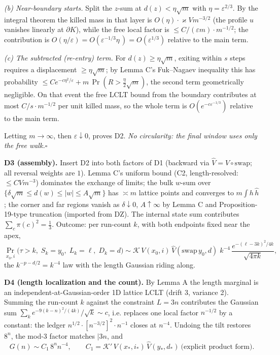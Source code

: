 \documentclass[11pt]{article}
\begin{document}
\emph{(b) Near-boundary starts.} Split the $z$-sum at $d(z)<\eta\sqrt m$ with
$\eta=\varepsilon^{2/3}$. By the integral theorem the killed mass in that layer is
$O(\eta)\cdot\varkappa V m^{-3/2}$ (the profile $u$ vanishes linearly at $\partial K$),
while the free local factor is $\le C/(\varepsilon m)\cdot m^{-1/2}$; the contribution is
$O(\eta/\varepsilon)=O(\varepsilon^{-1/3}\eta^{\,}\!)=O(\varepsilon^{1/3})$ relative to the
main term.

\emph{(c) The subtracted (re-entry) term.} For $d(z)\ge\eta\sqrt m$, exiting within $s$
steps requires a displacement $\ge\eta\sqrt m$; by Lemma C's Fuk--Nagaev inequality this
has probability $\le C e^{-c\eta^2/\varepsilon}+m\,\Pr(R>\tfrac{\eta}{2}\sqrt m)$, the
second term geometrically negligible. On that event the free LCLT bound from the boundary
contributes at most $C/s\cdot m^{-1/2}$ per unit killed mass, so the whole term is
$O(e^{-c\varepsilon^{-1/3}})$ relative to the main term.

Letting $m\to\infty$, then $\varepsilon\downarrow0$, proves D2. \emph{No circularity: the
final window uses only the free walk.}\hfill$\square$

\textbf{D3 (assembly).} Insert D2 into both factors of D1 (backward via
$\widehat V=V\circ\mathrm{swap}$; all reversal weights are $1$). Lemma C's uniform bound (C2, length-resolved: $\le CVm^{-3}$) dominates the exchange of limits; the bulk $w$-sum
over $\{\delta\sqrt m\le d(w)\le|w|\le A\sqrt m\}$ has $\asymp m$ lattice points and
converges to $m\!\int h\,\widehat h$; the corner and far regions vanish as
$\delta\downarrow0$, $A\uparrow\infty$ by Lemma C and Proposition-19-type truncation
(imported from DZ). The internal state sum contributes $\sum_c\pi(c)^2=\tfrac13$. Outcome:
per run-count $k$, with both endpoints fixed near the apex,
$$\Pr_{x_0,i}\big(\tau>k,\;S_k=y_0,\;L_k=\ell,\;D_k=d\big)
\sim\mathcal K\,V(x_0,i)\,\widehat V(\mathrm{swap}\,y_0,d)\;k^{-4}\,
\frac{e^{-(\ell-3k)^2/4k}}{\sqrt{4\pi k}},$$
the $k^{-p-d/2}=k^{-4}$ law with the length Gaussian riding along.

\textbf{D4 (length localization and the count).} By Lemma A the length marginal is an
independent-at-Gaussian-order 1D lattice LCLT (drift 3, variance 2). Summing the
run-count $k$ against the constraint $L=3n$ contributes the Gaussian sum
$\sum_k e^{-9(k-n)^2/(4k)}/\sqrt k\sim c$, i.e. replaces one local factor $n^{-1/2}$ by a
constant: the ledger $n^{1/2}\cdot[n^{-3/2}]^2\cdot n^{-1}$ closes at $n^{-4}$. Undoing the
tilt restores $8^n$, the mod-3 factor matches $|3n$, and
$$G(n)\sim C_1\,8^n n^{-4},\qquad
C_1=\mathcal K'\,V(x_\ast,i_\ast)\,\widehat V(y_\ast,d_\ast)\ \text{(explicit product form)}.$$
\end{document}
